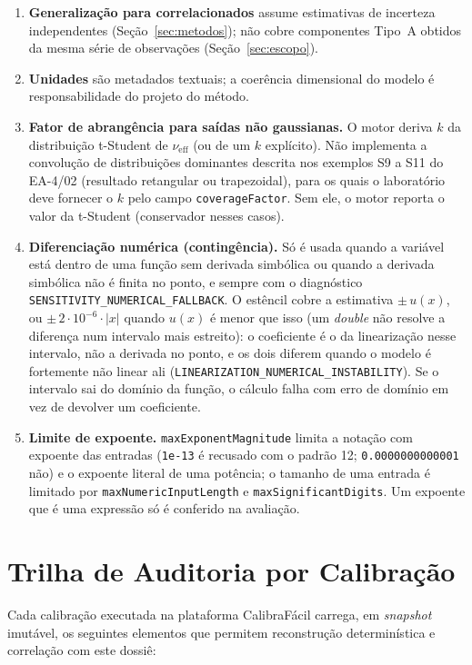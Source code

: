\documentclass[11pt,a4paper]{article}
\begin{document}
\begin{enumerate}
  \item \textbf{Generalização para correlacionados} assume estimativas de incerteza independentes (Seção~\ref{sec:metodos}); não cobre componentes Tipo~A obtidos da mesma série de observações (Seção~\ref{sec:escopo}).
  \item \textbf{Unidades} são metadados textuais; a coerência dimensional do modelo é responsabilidade do projeto do método.
  \item \textbf{Fator de abrangência para saídas não gaussianas.} O motor deriva \(k\) da distribuição t-Student de \(\nu_{\text{eff}}\) (ou de um \(k\) explícito). Não implementa a convolução de distribuições dominantes descrita nos exemplos S9 a S11 do EA-4/02 (resultado retangular ou trapezoidal), para os quais o laboratório deve fornecer o \(k\) pelo campo \texttt{coverageFactor}. Sem ele, o motor reporta o valor da t-Student (conservador nesses casos).
  \item \textbf{Diferenciação numérica (contingência).} Só é usada quando a variável está dentro de uma função sem derivada simbólica ou quando a derivada simbólica não é finita no ponto, e sempre com o diagnóstico \texttt{SENSITIVITY\_NUMERICAL\_FALLBACK}. O estêncil cobre a estimativa \(\pm\, u(x)\), ou \(\pm\, 2 \cdot 10^{-6} \cdot |x|\) quando \(u(x)\) é menor que isso (um \emph{double} não resolve a diferença num intervalo mais estreito): o coeficiente é o da linearização nesse intervalo, não a derivada no ponto, e os dois diferem quando o modelo é fortemente não linear ali (\texttt{LINEARIZATION\_NUMERICAL\_INSTABILITY}). Se o intervalo sai do domínio da função, o cálculo falha com erro de domínio em vez de devolver um coeficiente.
  \item \textbf{Limite de expoente.} \texttt{maxExponentMagnitude} limita a notação com expoente das entradas (\texttt{1e-13} é recusado com o padrão 12; \texttt{0.0000000000001} não) e o expoente literal de uma potência; o tamanho de uma entrada é limitado por \texttt{maxNumericInputLength} e \texttt{maxSignificantDigits}. Um expoente que é uma expressão só é conferido na avaliação.
\end{enumerate}

\section{Trilha de Auditoria por Calibração}

Cada calibração executada na plataforma CalibraFácil carrega, em \emph{snapshot} imutável, os seguintes elementos que permitem reconstrução determinística e correlação com este dossiê:
\end{document}
